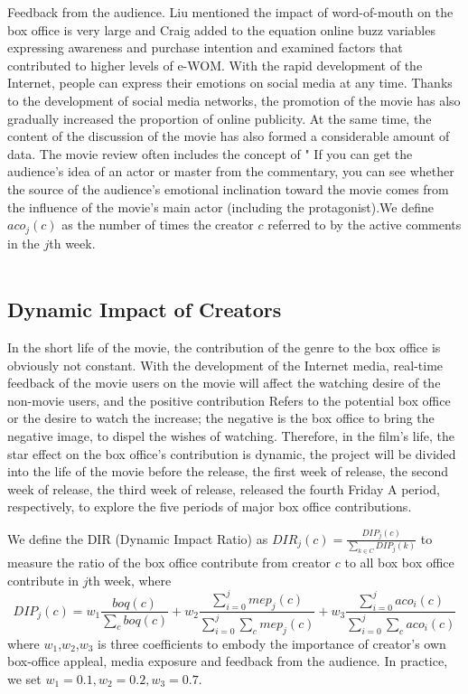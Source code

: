 \par Feedback from the audience. Liu \cite{liu2006word} mentioned the impact of word-of-mouth on the box office is very large and Craig \cite{craig2015word}added to the equation online buzz variables expressing awareness and purchase intention and examined factors that contributed to higher levels of e-WOM. With the rapid development of the Internet, people can express their emotions on social media at any time. Thanks to the development of social media networks, the promotion of the movie has also gradually increased the proportion of online publicity. At the same time, the content of the discussion of the movie has also formed a considerable amount of data. The movie review often includes the concept of " If you can get the audience's idea of ​​an actor or master from the commentary, you can see whether the source of the audience's emotional inclination toward the movie comes from the influence of the movie's main actor (including the protagonist).We define $aco_j(c)$ as the number of times the creator $c$ referred to by the active comments in the $j$th week.\\\\
\subsection{Dynamic Impact of Creators}
\par In the short life of the movie, the contribution of the genre to the box office is obviously not constant. With the development of the Internet media, real-time feedback of the movie users on the movie will affect the watching desire of the non-movie users, and the positive contribution Refers to the potential box office or the desire to watch the increase; the negative is the box office to bring the negative image, to dispel the wishes of watching. Therefore, in the film's life, the star effect on the box office's contribution is dynamic, the project will be divided into the life of the movie before the release, the first week of release, the second week of release, the third week of release, released the fourth Friday A period, respectively, to explore the five periods of major box office contributions. \\
\par We define the DIR (Dynamic Impact Ratio) as $DIR_j(c)=\frac{DIP_j(c)}{\sum_{k\in C}DIP_j(k)}$ to measure the ratio of the box office contribute from creator $c$ to all box box office contribute in $j$th week, where 
\begin{equation}
DIP_j(c)=w_1\frac{boq(c)}{\sum_{c}boq(c)}+w_2\frac{\sum_{i=0}^{j}mep_j(c)}{\sum_{i=0}^{j}\sum_{c}mep_j(c)}+w_3\frac{\sum_{i=0}^{j}aco_i(c)}{\sum_{i=0}^{j}\sum_{c}aco_i(c)}
\end{equation}
where $w_1$,$w_2$,$w_3$ is three coefficients to embody the importance of creator's own box-office appleal, media exposure and feedback from the audience. In practice, we set $w_1=0.1,w_2=0.2,w_3=0.7$.

